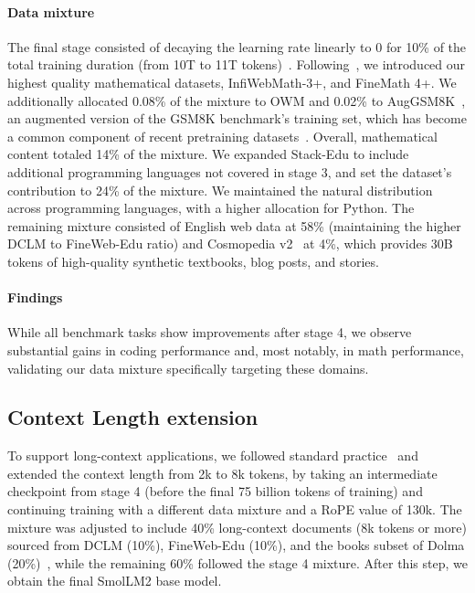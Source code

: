 \documentclass{article}
\theoremstyle{plain}
\theoremstyle{definition}
\theoremstyle{remark}
\begin{document}
\paragraph{Data mixture} The final stage consisted of decaying the learning rate linearly to 0 for 10\% of the total training duration (from 10T to 11T tokens)~\cite{hagele2024scaling}. Following~\citet{blakeney2024does}, we introduced our highest quality mathematical datasets, InfiWebMath-3+, and FineMath 4+. 
We additionally allocated 0.08\% of the mixture to OWM and 0.02\% to AugGSM8K~\cite{li2024mugglemath}, an augmented version of the GSM8K benchmark's training set, which has become a common component of recent pretraining datasets~\cite{achiam2023gpt,dubey2024llama,olmo2_2024}.
Overall, mathematical content totaled 14\% of the mixture.
We expanded Stack-Edu to include additional programming languages not covered in stage 3, and set the dataset's contribution to 24\% of the mixture. We maintained the natural distribution across programming languages, with a higher allocation for Python. The remaining mixture consisted of English web data at 58\% (maintaining the higher DCLM to FineWeb-Edu ratio) and Cosmopedia v2~\cite{allal2024SmolLM} at 4\%, which provides 30B tokens of high-quality synthetic textbooks, blog posts, and stories.

\vspace{-0.2cm} 
\paragraph{Findings} While all benchmark tasks show improvements after stage 4, we observe substantial gains in coding performance and, most notably, in math performance, validating our data mixture specifically targeting these domains.

\vspace{-0.1cm} 
\subsection{Context Length extension}
\vspace{-0.1cm} 

To support long-context applications, we followed standard practice~\cite{gao2024trainlongcontextlanguagemodels} and extended the context length from 2k to 8k tokens, by taking an intermediate checkpoint from stage 4 (before the final 75 billion tokens of training) and continuing training with a different data mixture and a RoPE value of 130k.
The mixture was adjusted to include 40\% long-context documents (8k tokens or more) sourced from DCLM (10\%), FineWeb-Edu (10\%), and the books subset of Dolma (20\%)~\cite{soldaini2024dolma}, while the remaining 60\% followed the stage 4 mixture. After this step, we obtain the final SmolLM2 base model. 
\end{document}
